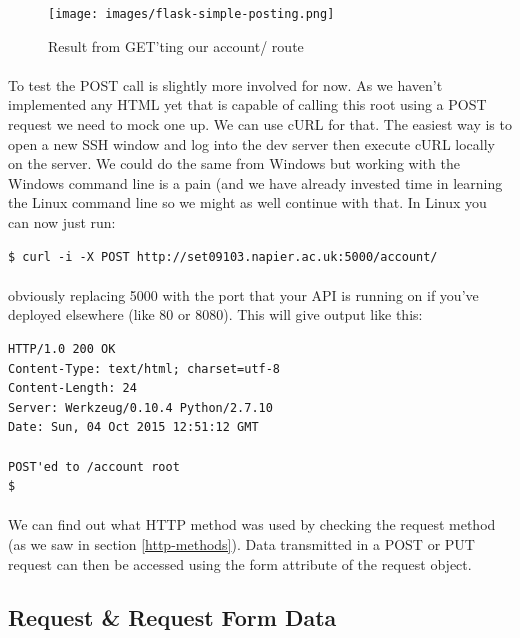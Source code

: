 \documentclass[12pt, a4paper, oneside]{book}
\begin{document}
\begin{figure}[H]
\centering
\texttt{[image: images/flask-simple-posting.png]}
\caption{Result from GET'ting our account/ route}
\label{fig:flask-simple-posting}
\end{figure}


\paragraph{} To test the POST call is slightly more involved for now. As we haven't implemented any HTML yet that is capable of calling this root using a POST request we need to mock one up. We can use cURL for that. The easiest way is to open a new SSH window and log into the dev server then execute cURL locally on the server. We could do the same from Windows but working with the Windows command line is a pain (and we have already invested time in learning the Linux command line so we might as well continue with that. In Linux you can now just run:

\begin{lstlisting}[style=DOS]
$ curl -i -X POST http://set09103.napier.ac.uk:5000/account/
\end{lstlisting}

\paragraph{} obviously replacing 5000 with the port that your API is running on if you've deployed elsewhere (like 80 or 8080). This will give output like this:

\begin{lstlisting}[style=DOS]
HTTP/1.0 200 OK
Content-Type: text/html; charset=utf-8
Content-Length: 24
Server: Werkzeug/0.10.4 Python/2.7.10
Date: Sun, 04 Oct 2015 12:51:12 GMT

POST'ed to /account root
$ 
\end{lstlisting}

\paragraph{} We can find out what HTTP method was used by checking the request method (as we saw in section \ref{http-methods}). Data transmitted in a POST or PUT request can then be accessed using the form attribute of the request object.

\subsection{Request \& Request Form Data}
\label{requests-objects-and-form-data}
\end{document}
